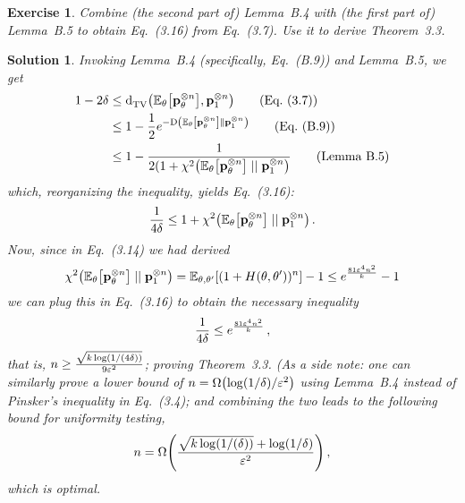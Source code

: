 \documentclass[biber,plain]{nowfnt} %
\newtheorem{question}{Exercise}[chapter]
\newtheorem{solution}{Solution}[chapter]
\newcommand{\exercise}[1]{\marginnote{\textbf{E:} #1}}
\begin{document}
\begin{question}\label{exo:deriving:dep:delta:lb}
Combine (the second part of) Lemma~B.4 with (the first part of) Lemma~B.5 to obtain Eq.~(3.16) from Eq.~(3.7). Use it to derive Theorem~3.3.
\end{question}
\begin{solution}
Invoking Lemma~B.4 (specifically, Eq.~(B.9)) and Lemma~B.5, we get
\begin{align*}
	1-2\errprob 
	&\leq \totalvardist{\bE{\theta}{\p_\theta^{\otimes\ns}}}{\p_\accept^{\otimes\ns}} \tag{Eq.~(3.7)}\\
	&\leq 1-\frac{1}{2}e^{-\kldiv{\bE{\theta}{\p_\theta^{\otimes\ns}}}{\p_\accept^{\otimes\ns}}} \tag{Eq.~(B.9)}\\
	&\leq 1-\frac{1}{2(1+\chisquare{\bE{\theta}{\p_\theta^{\otimes\ns}}}{\p_\accept^{\otimes\ns}}} \tag{Lemma~B.5}
\end{align*}
which, reorganizing the inequality, yields Eq.~(3.16):
\[
	\frac{1}{4\errprob} \leq 1+\chisquare{\bE{\theta}{\p_\theta^{\otimes\ns}}}{\p_\accept^{\otimes\ns}}\,.
\]
Now, since in Eq.~(3.14) we had derived 
\[
	\chisquare{\bE{\theta}{\p_\theta^{\otimes\ns}}}{\p_\accept^{\otimes\ns}}
	= \bE{\theta,\theta'}{(1+{H(\theta,\theta')})^\ns} - 1
	\leq e^{\frac{81\dst^4\ns^2}{\ab}} - 1
\]
we can plug this in Eq.~(3.16) to obtain the necessary inequality 
\begin{equation}
\frac{1}{4\delta} \leq e^{\frac{81\varepsilon^4n^2}{k}}\,,
\end{equation}
that is, $n \geq \frac{ \sqrt{ k \log(1/(4\delta)) } }{ 9\varepsilon^2 }$; proving Theorem~3.3. \emph{(As a side note: one can similarly}\exercise{Try it!} \emph{prove a lower bound of $\ns = \bigOmega{\log(1/\errprob)/\dst^2}$ using Lemma~B.4 instead of Pinsker's inequality in Eq.~(3.4); and combining the two leads to the following bound for uniformity testing, 
\begin{equation}
	\ns = \bigOmega{\frac{ \sqrt{ \ab \log(1/(\errprob)) } + \log(1/\errprob) }{ \dst^2 }}\,,
\end{equation}
which is optimal.}
\end{solution}
\end{document}
